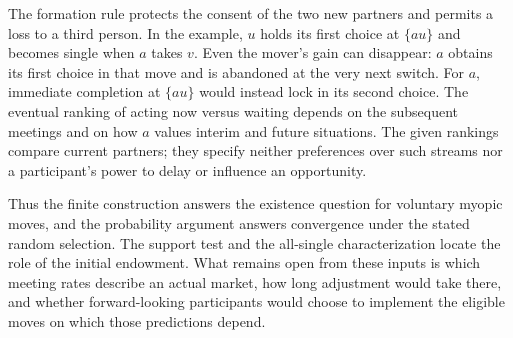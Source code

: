 \documentclass[11pt]{article}
\begin{document}
The formation rule protects the consent of the two new partners and permits a loss to a third person. In the example, \(u\) holds its first choice at \(\{au\}\) and becomes single when \(a\) takes \(v\). Even the mover's gain can disappear: \(a\) obtains its first choice in that move and is abandoned at the very next switch. For \(a\), immediate completion at \(\{au\}\) would instead lock in its second choice. The eventual ranking of acting now versus waiting depends on the subsequent meetings and on how \(a\) values interim and future situations. The given rankings compare current partners; they specify neither preferences over such streams nor a participant's power to delay or influence an opportunity.

Thus the finite construction answers the existence question for voluntary myopic moves, and the probability argument answers convergence under the stated random selection. The support test and the all-single characterization locate the role of the initial endowment. What remains open from these inputs is which meeting rates describe an actual market, how long adjustment would take there, and whether forward-looking participants would choose to implement the eligible moves on which those predictions depend.
\end{document}
